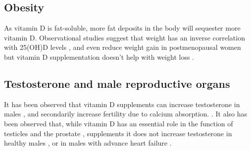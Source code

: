 \subsection{Obesity}

As vitamin D is fat-soluble, more fat deposits in the body will sequester more vitamin D. Observational studies suggest that weight has an inverse correlation with 25(OH)D levels \cite{ref:Ekwaru2014, ref:Drincic2013, ref:Earthman2011, ref:Mallard2016}, and even reduce weight gain in postmenopausal women \cite{ref:Caan2007} but vitamin D supplementation doesn't help with weight loss \cite{ref:Pathak2014}.

\subsection{Testosterone and male reproductive organs}

It has been observed that vitamin D supplements can increase testosterone in males \cite{Pilz2010}, and secondarily increase fertility due to calcium absorption. \cite{ref:1_Institute_of_Medicine2011-zg, ref:2_Limongi2017-al, ref:3_680f7627099e40be878db46152ebe484}. It also has been observed that, while vitamin D has an essential role in the function of testicles and the prostate \cite{Santos2020},  supplements it does not increase testosterone in healthy males \cite{Lerchbaum2017, Santos2020}, or in males with advance heart failure \cite{Zittermann2018}.


